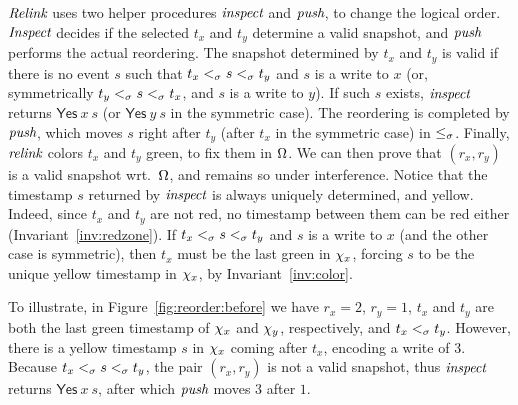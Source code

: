 $\textit{Relink}$ uses two helper procedures $\textit{inspect}$ and
$\textit{push}$, to change the logical order. $\textit{Inspect}$ decides if
the selected $t_x$ and $t_y$ determine a valid snapshot, and
$\textit{push}$ performs the actual reordering. The snapshot determined
by $t_x$ and $t_y$ is valid if there is no event $s$ such that
$t_x \mathrel{<_\sigma} s \mathrel{<_\sigma} t_y$ and $s$ is a write to $x$ (or, symmetrically
$t_y \mathrel{<_\sigma} s \mathrel{<_\sigma} t_x$, and $s$ is a write to $y$). If such $s$ exists,
$\textit{inspect}$ returns $\mathsf{Yes}\ x\ s$ (or $\mathsf{Yes}\ y\ s$
in the symmetric case). The reordering is completed by $\textit{push}$,
which moves $s$ right after $t_y$ (after $t_x$ in the symmetric case)
in $\mathrel{\leq_\sigma}$. Finally, $\textit{relink}$ colors $t_x$ and $t_y$ green, to
fix them in $\Omega$. We can then prove that $(r_x, r_y)$ is a
valid snapshot wrt.~$\Omega$, and remains so under interference.
%
Notice that the timestamp $s$ returned by $\textit{inspect}$ is always
uniquely determined, and yellow. Indeed, since $t_x$ and $t_y$ are not
red, no timestamp between them can be red either
(Invariant~\ref{inv:redzone}). If $t_x \mathrel{<_\sigma} s \mathrel{<_\sigma} t_y$ and $s$ is a
write to $x$ (and the other case is symmetric), then $t_x$ must be the
last green in $\chi_x$, forcing $s$ to be the unique yellow timestamp
in $\chi_x$, by Invariant~\ref{inv:color}.


%
To illustrate, in Figure~\ref{fig:reorder:before} we have $r_x = 2$,
$r_y = 1$, $t_x$ and $t_y$ are both the last green timestamp of
$\chi_x$ and $\chi_y$, respectively, and $t_x \mathrel{<_\sigma} t_y$. However,
there is a yellow timestamp $s$ in $\chi_x$ coming after $t_x$,
encoding a write of $3$. Because $t_x \mathrel{<_\sigma} s \mathrel{<_\sigma} t_y$, the pair
$(r_x, r_y)$ is not a valid snapshot, thus $\textit{inspect}$ returns
$\mathsf{Yes}\ x\ s$, after which $\textit{push}$ moves $3$ after $1$.

%


